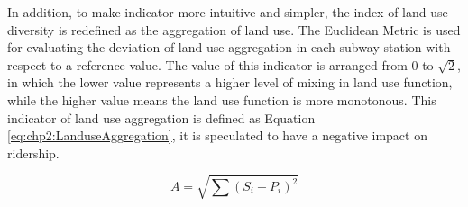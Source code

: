 %		
%		

%
In addition, to make indicator more intuitive and simpler, the index of land use diversity is redefined as the aggregation of land use. The Euclidean Metric is used for evaluating the deviation of land use aggregation in each subway station with respect to a reference value. The value of this indicator is arranged from $0$ to $\sqrt{2}$, in which the lower value represents a higher level of mixing in land use function, while the higher value means the land use function is more monotonous. This indicator of land use aggregation is defined as Equation \ref{eq:chp2:LanduseAggregation}, it is speculated to have a negative impact on ridership.

\begin{equation}
A=\sqrt{\sum (S_i-P_i)^2}
\label{eq:chp2:LanduseAggregation}
\end{equation}


